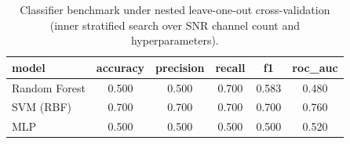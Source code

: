 \begin{table}[!t]
\centering
\caption{Classifier benchmark under nested leave-one-out cross-validation (inner stratified search over SNR channel count and hyperparameters).}
\label{tab:loocv}
\begin{tabular}{lccccc}
\hline
\textbf{model} & \textbf{accuracy} & \textbf{precision} & \textbf{recall} & \textbf{f1} & \textbf{roc\_auc} \\
\hline
Random Forest & 0.500 & 0.500 & 0.700 & 0.583 & 0.480 \\
SVM (RBF) & 0.700 & 0.700 & 0.700 & 0.700 & 0.760 \\
MLP & 0.500 & 0.500 & 0.500 & 0.500 & 0.520 \\
\hline
\end{tabular}
\end{table}
